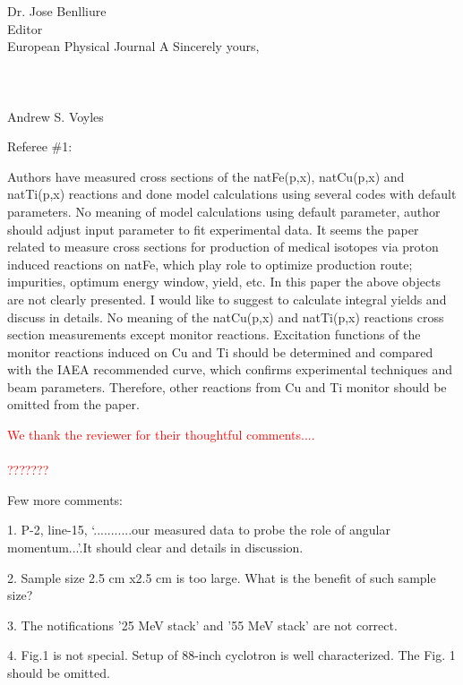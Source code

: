 \documentclass{letter} %
\newcommand{\colornote}[1]{\textcolor{red}{#1}}
\begin{document}
\begin{letter}{Dr. Jose Benlliure \\
Editor \\
European Physical Journal A}
  Sincerely yours,\\ \\ \\ \\ Andrew S. Voyles
 

  \vfill
  
 \pagebreak
 
 
 
 Referee \#1:
 
Authors have measured cross sections of the natFe(p,x), natCu(p,x) and natTi(p,x) reactions and done
model calculations using several codes with default parameters. No meaning of model calculations using
default parameter, author should adjust input parameter to fit experimental data.
It seems the paper related to measure cross sections for production of medical isotopes via proton
induced reactions on natFe, which play role to optimize production route; impurities, optimum energy
window, yield, etc. In this paper the above objects are not clearly presented. I would like to suggest to
calculate integral yields and discuss in details.
No meaning of the natCu(p,x) and natTi(p,x) reactions cross section measurements except monitor
reactions. Excitation functions of the monitor reactions induced on Cu and Ti should be determined and
compared with the IAEA recommended curve, which confirms experimental techniques and beam
parameters. Therefore, other reactions from Cu and Ti monitor should be omitted from the paper.

 \colornote{We thank the reviewer for their thoughtful comments....\\\\ ???????}




Few more comments:

1. P-2, line-15, ‘...........our measured data to probe the role of angular momentum...’.It should
clear and details in discussion.

2. Sample size 2.5 cm x2.5 cm is too large. What is the benefit of such sample size?

3. The notifications ’25 MeV stack’ and ’55 MeV stack’ are not correct.

4. Fig.1 is not special. Setup of 88-inch cyclotron is well characterized. The Fig. 1 should be
omitted.


\end{letter}
\end{document}
